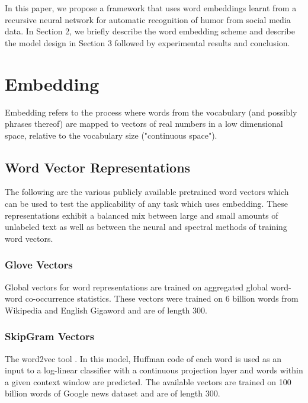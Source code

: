 \documentclass{acm_proc_article-sp}
\begin{document}
In this paper, we propose a framework that uses word embeddings learnt from a recursive neural network for automatic recognition of humor from social media data. In Section 2, we briefly describe the word embedding scheme and describe the model design in Section 3 followed by experimental results and conclusion.



\section { Embedding }

Embedding refers to the process where words from the vocabulary (and possibly phrases thereof) are mapped to vectors of real numbers in a low dimensional space, relative to the vocabulary size ("continuous space").

\subsection{Word Vector Representations}

The following are the various publicly available pretrained word vectors which can be used to test the applicability of any task which uses embedding. These representations exhibit a balanced mix between
large and small amounts of unlabeled text as well as between the neural and spectral methods of training word vectors. 

\subsubsection{Glove Vectors}

Global vectors for word representations \cite{pennington2014glove} are trained on aggregated global word-word co-occurrence statistics. These vectors were trained on 6 billion words from Wikipedia and English Gigaword and are of length 300.


\subsubsection{SkipGram Vectors}

The word2vec tool \cite{mikolov2013distributed}. In this model, Huffman code of each word is used as an input to a log-linear classifier with a continuous projection layer and words within a given context window are predicted. The available vectors are trained on 100 billion words of Google news dataset and are of length 300. 
\end{document}
